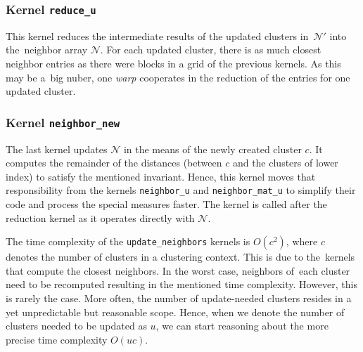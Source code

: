 \subsubsection{Kernel \texttt{reduce\_u}} This kernel reduces the intermediate results of the updated clusters in~$\mathcal{N}'$ into the~neighbor array $\mathcal{N}$. For each updated cluster, there is as much closest neighbor entries as there were blocks in a grid of the previous kernels. As this may be a~big nuber, one \emph{warp} cooperates in the reduction of the entries for one updated cluster.

\subsubsection{Kernel \texttt{neighbor\_new}} The last kernel updates $\mathcal{N}$ in the means of the newly created cluster $c$. It computes the remainder of the distances (between $c$ and the clusters of lower index) to satisfy the mentioned invariant. Hence, this kernel moves that responsibility from the kernels \texttt{neighbor\_u} and \texttt{neighbor\_mat\_u} to simplify their code and process the special measures faster. The kernel is called after the reduction kernel as it operates directly with $\mathcal{N}$. 

\begin{rem}
	The time complexity of the \texttt{update\_neighbors} kernels is $O(c^2)$, where $c$ denotes the number of clusters in a clustering context. This is due to the~kernels that compute the closest neighbors. In the worst case, neighbors of~each cluster need to be recomputed resulting in the mentioned time complexity. However, this is rarely the case. More often, the number of update-needed clusters resides in a yet unpredictable but reasonable scope. Hence, when we denote the number of clusters needed to be updated as $u$, we can start reasoning about the more precise time complexity $O(uc)$.
\end{rem}
